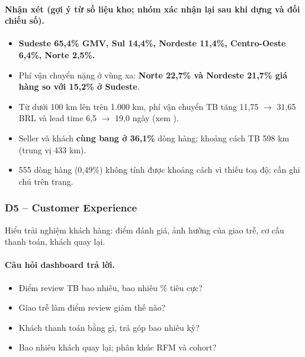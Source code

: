 
\paragraph{Nhận xét (gợi ý từ số liệu kho; \textbf{nhóm xác nhận lại sau khi dựng và đối chiếu số}).}

\begin{itemize}
  \item \textbf{Sudeste 65,4\% GMV, Sul 14,4\%, Nordeste 11,4\%, Centro-Oeste 6,4\%, Norte 2,5\%.}
  \item Phí vận chuyển nặng ở vùng xa: \textbf{Norte 22,7\% và Nordeste 21,7\% giá hàng so với 15,2\% ở Sudeste}.
  \item Từ dưới 100 km lên trên 1.000 km, phí vận chuyển TB tăng 11,75 $\rightarrow$ 31,65 BRL và lead time 6,5 $\rightarrow$ 19,0 ngày (xem ).
  \item Seller và khách \textbf{cùng bang ở 36,1\%} dòng hàng; khoảng cách TB 598 km (trung vị 433 km).
  \item 555 dòng hàng (0,49\%) không tính được khoảng cách vì thiếu toạ độ; cần ghi chú trên trang.
\end{itemize}

\subsubsection*{D5 – Customer Experience}

Hiểu trải nghiệm khách hàng: điểm đánh giá, ảnh hưởng của giao trễ, cơ cấu thanh toán, khách quay lại.

\paragraph{Câu hỏi dashboard trả lời.}

\begin{itemize}
  \item Điểm review TB bao nhiêu, bao nhiêu \% tiêu cực?
  \item Giao trễ làm điểm review giảm thế nào?
  \item Khách thanh toán bằng gì, trả góp bao nhiêu kỳ?
  \item Bao nhiêu khách quay lại; phân khúc RFM và cohort?
\end{itemize}

